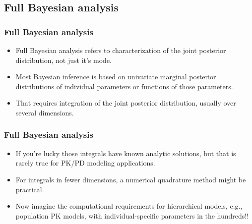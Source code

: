 \documentclass{beamer}
\begin{document}





\subsection{Full Bayesian analysis}

\begin{frame}
  \frametitle{Full Bayesian analysis}

  \begin{itemize}
\item Full Bayesian analysis refers to characterization of the joint
posterior distribution, not just it's mode.
\item Most Bayesian inference is based on univariate marginal
  posterior distributions of individual parameters or functions of
 those parameters.
\item That requires integration of the joint posterior distribution,
  usually over several dimensions.
  \end{itemize}

\end{frame}

\begin{frame}
  \frametitle{Full Bayesian analysis}

  \begin{itemize}
  \item If you're lucky those integrals have known analytic solutions,
    but that is rarely true for PK/PD modeling applications.
  \item For integrals in fewer dimensions, a numerical
    quadrature method might be practical. 
  \item Now imagine the computational requirements for hierarchical
    models, e.g., population PK models, with individual-specific
    parameters in the hundreds!!
  \end{itemize}

\end{frame}
\end{document}
